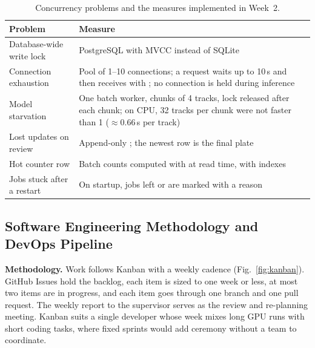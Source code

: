 \begin{table}[tbp]
\centering
\caption{Concurrency problems and the measures implemented in Week~2.}
\label{tab:concurrency}
\begin{tabularx}{\textwidth}{@{}P{28mm} L@{}}
\toprule
Problem & Measure \\
\midrule
Database-wide write lock & PostgreSQL with MVCC instead of SQLite \\
Connection exhaustion & Pool of 1--10 connections; a request waits up to 10\,s and then receives  with ; no connection is held during inference \\
Model starvation & One batch worker, chunks of 4 tracks, lock released after each chunk; on CPU, 32 tracks per chunk were not faster than 1 ($\approx$0.66\,s per track) \\
Lost updates on review & Append-only ; the newest row is the final plate \\
Hot counter row & Batch counts computed with  at read time, with indexes \\
Jobs stuck after a restart & On startup, jobs left  or  are marked  with a reason \\
\bottomrule
\end{tabularx}
\end{table}


\subsection{Software Engineering Methodology and DevOps Pipeline}

\textbf{Methodology.} Work follows Kanban with a weekly cadence
(Fig.~\ref{fig:kanban}). GitHub Issues hold the backlog, each item is sized to one week or less, at
most two items are in progress, and each item goes through one branch and one pull request. The
weekly report to the supervisor serves as the review and re-planning meeting. Kanban suits a single
developer whose week mixes long GPU runs with short coding tasks, where fixed sprints would add
ceremony without a team to coordinate.


